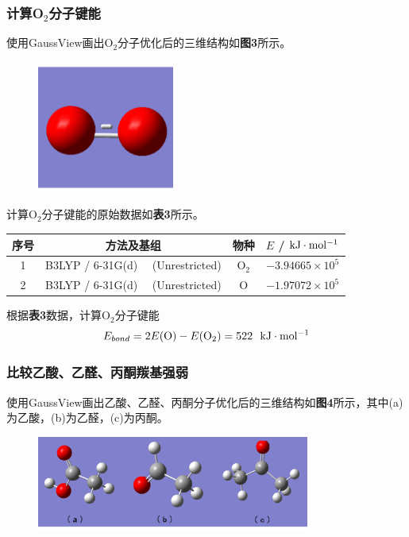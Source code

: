 \documentclass[12pt]{article}
\begin{document}
 		\subsubsection{计算O$_{2}$分子键能}
 			使用GaussView画出O$_{2}$分子优化后的三维结构如\textbf{图3}所示。\par
 		\begin{figure}[h]
 			\centering
 			\includegraphics[width=0.4\textwidth]{3.png}
 		\end{figure}
 		计算O$_{2}$分子键能的原始数据如\textbf{表3}所示。\par
 		  \begin{table}[h]
 			\centering
 			\begin{tabular}{cccc}
 				\toprule
 					序号 & 方法及基组 & 物种 & $E$ / $\rm kJ \cdot mol^{-1} $ \\
 				\midrule
 				1 & B3LYP / 6-31G(d) \ \ (Unrestricted) & O$_{2}$ & $-3.94665 \times 10^{5}$ \\
 				2 & B3LYP / 6-31G(d) \ \ (Unrestricted) & O & $-1.97072 \times 10^{5}$ \\
 				\bottomrule
 			\end{tabular}
 		\end{table}
 	根据\textbf{表3}数据，计算O$_{2}$分子键能$$E_{bond}=2E({\rm O})-E{\rm (O_{2})}=522\ \ {\rm kJ \cdot mol^{-1}}$$
 	
 		\subsubsection{比较乙酸、乙醛、丙酮羰基强弱}
 			使用GaussView画出乙酸、乙醛、丙酮分子优化后的三维结构如\textbf{图4}所示，其中(a)为乙酸，(b)为乙醛，(c)为丙酮。\newpage
 		
 		\begin{figure}[h]
 			\centering
 			\includegraphics[width=0.8\textwidth]{4.png}
 		\end{figure}
 		
\end{document}
